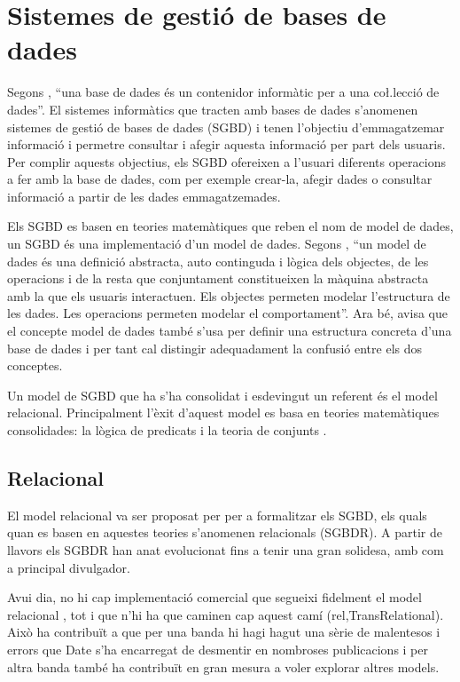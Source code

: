 \section[SGBD]{Sistemes de gestió de bases de dades}
\label{sec:art:sgbd}


Segons \textcite{date}, ``una base de dades és un contenidor informàtic per a una co\l.lecció de dades''. El sistemes informàtics que tracten amb bases de dades s'anomenen sistemes de gestió de bases de dades (SGBD) i tenen l'objectiu d'emmagatzemar informació i permetre consultar i afegir aquesta informació  per part dels usuaris.
Per complir aquests objectius, els SGBD ofereixen a l'usuari diferents operacions a fer amb la base de dades, com per exemple crear-la, afegir dades o consultar informació a partir de les dades emmagatzemades.

Els SGBD es basen en teories matemàtiques que reben el nom de model de dades, un SGBD és una implementació d'un model de dades.
Segons \citeauthor{date}, ``un model de dades és una definició abstracta, auto continguda i lògica dels objectes, de les operacions i  de la resta que conjuntament constitueixen la màquina abstracta amb la que els usuaris interactuen. Els objectes permeten modelar l'estructura de les dades. Les operacions permeten modelar el comportament''. Ara bé, \citeauthor{date} avisa que el concepte model de dades també s'usa per definir una estructura concreta d'una base de dades i per tant cal distingir adequadament la confusió entre els dos conceptes.

Un model de SGBD que ha s'ha consolidat i esdevingut un referent és el model relacional. Principalment l'èxit d'aquest model es basa en teories matemàtiques consolidades: la lògica de predicats i la teoria de conjunts \parencite{date}.



\subsection{Relacional}

El model relacional va ser proposat per \textcite{codd70} per a formalitzar els SGBD, els quals quan es basen en aquestes teories s'anomenen relacionals (SGBDR). A partir de llavors els SGBDR han anat evolucionat fins a tenir una gran solidesa, amb \textcite{date,date06} com a principal divulgador.

Avui dia, no hi cap implementació comercial que segueixi fidelment el model relacional , tot i que n'hi ha que caminen cap aquest camí (rel,TransRelational). Això ha contribuït a que per una banda hi hagi hagut una sèrie de malentesos i errors que Date s'ha encarregat de desmentir en nombroses publicacions  i per altra banda també ha contribuït en gran mesura a voler explorar altres models.              


